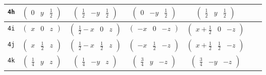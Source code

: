 \documentclass[fleqn,9pt,landscape]{jsarticle}
\begin{document}
\begin{center}
\begin{longtable}{ccccccc}
{\tt 4h} & $ \begin{pmatrix} 0 & y & \frac{1}{2} \end{pmatrix} $ & $ \begin{pmatrix} \frac{1}{2} & - y & \frac{1}{2} \end{pmatrix} $ & $ \begin{pmatrix} 0 & - y & \frac{1}{2} \end{pmatrix} $ & $ \begin{pmatrix} \frac{1}{2} & y & \frac{1}{2} \end{pmatrix} $ & $  $ & $  $ \\ \hline
{\tt 4i} & $ \begin{pmatrix} x & 0 & z \end{pmatrix} $ & $ \begin{pmatrix} \frac{1}{2} - x & 0 & z \end{pmatrix} $ & $ \begin{pmatrix} - x & 0 & - z \end{pmatrix} $ & $ \begin{pmatrix} x + \frac{1}{2} & 0 & - z \end{pmatrix} $ & $  $ & $  $ \\ \hline
{\tt 4j} & $ \begin{pmatrix} x & \frac{1}{2} & z \end{pmatrix} $ & $ \begin{pmatrix} \frac{1}{2} - x & \frac{1}{2} & z \end{pmatrix} $ & $ \begin{pmatrix} - x & \frac{1}{2} & - z \end{pmatrix} $ & $ \begin{pmatrix} x + \frac{1}{2} & \frac{1}{2} & - z \end{pmatrix} $ & $  $ & $  $ \\ \hline
{\tt 4k} & $ \begin{pmatrix} \frac{1}{4} & y & z \end{pmatrix} $ & $ \begin{pmatrix} \frac{1}{4} & - y & z \end{pmatrix} $ & $ \begin{pmatrix} \frac{3}{4} & y & - z \end{pmatrix} $ & $ \begin{pmatrix} \frac{3}{4} & - y & - z \end{pmatrix} $ & $  $ & $  $ \\ \hline

\end{longtable}
\end{center}
\end{document}

